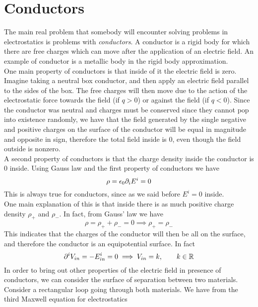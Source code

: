 \documentclass[../electromagnetism]{subfiles}
\begin{document}
\section{Conductors}
The main real problem that somebody will encounter solving problems in electrostatics is problems with \textit{conductors}. A conductor is a rigid body for which there are free charges which can move after the application of an electric field. An example of conductor is a metallic body in the rigid body approximation.\\
One main property of conductors is that inside of it the electric field is zero.\\
Imagine taking a neutral box conductor, and then apply an electric field parallel to the sides of the box. The free charges will then move due to the action of the electrostatic force towards the field (if $q>0$) or against the field (if $q<0$). Since the conductor was neutral and charges must be conserved since they cannot pop into existence randomly, we have that the field generated by the single negative and positive charges on the surface of the conductor will be equal in magnitude and opposite in sign, therefore the total field inside is 0, even though the field outside is nonzero.\\
A second property of conductors is that the charge density inside the conductor is 0 inside. Using Gauss law and the first property of conductors we have
\begin{equation}
	\rho=\epsilon_0\partial_iE^i=0
	\label{eq:glinsidecond}
\end{equation}
This is always true for conductors, since as we said before $E^i=0$ inside.\\
One main explanation of this is that inside there is as much positive charge density $\rho_+$ and $\rho_-$. In fact, from Gauss' law we have
\begin{equation*}
	\rho=\rho_++\rho_-=0\implies\rho_+=\rho_-
\end{equation*}
This indicates that the charges of the conductor will then be all on the surface, and therefore the conductor is an equipotential surface. In fact
\begin{equation}
	\partial^i V_{in}=-E^i_{in}=0\implies V_{in}=k,\qquad k\in\operatorname{\mathbb{R}}
	\label{eq:equipotentialconductor}
\end{equation}
In order to bring out other properties of the electric field in presence of conductors, we can consider the surface of separation between two materials. Consider a rectangular loop going through both materials. We have from the third Maxwell equation for electrostatics
\end{document}
